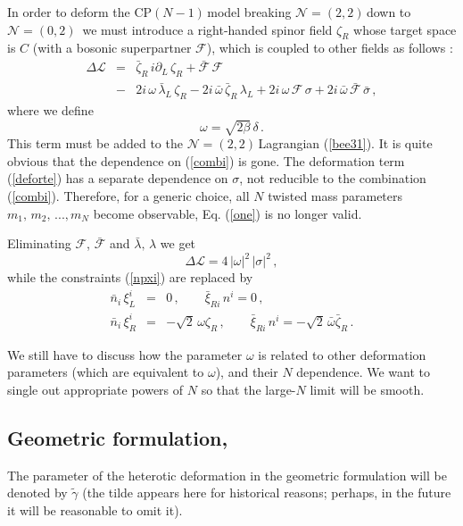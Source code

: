 \documentclass[epsfig,12pt]{article}
\def\beq{\begin{equation}}
\def\eeq{\end{equation}}
\def\beqn{\begin{eqnarray}}
\def\eeqn{\end{eqnarray}}
\newcommand{\ntt}{${\mathcal N}=(2,2)\,$}
\newcommand{\nzt}{${\mathcal N}=(0,2)\,$}
\newcommand{\cpn}{CP$(N-1)\,$}
\newcommand{\cell}{{\mathcal L}}
\newcommand{\pt}{\partial}
\newcommand{\cf}{${\mathcal F}$}
\newcommand{\cfe}{{\mathcal F}}
\def\beqn{\begin{eqnarray}}
\def\eeqn{\end{eqnarray}}
\def\beq{\begin{equation}}
\def\eeq{\end{equation}}
\begin{document}
In order to deform the \cpn model breaking \ntt down to \mbox{\nzt}
we must introduce a right-handed spinor field $\zeta_R$ whose  target space is $C$ 
(with a bosonic superpartner \cf), which is coupled to other fields as follows
\cite{EdTo,SY1}:
\beqn
\Delta\cell 
&=&
\bar\zeta_R\, i\pt_L\, \zeta_R   +\bar\cfe\,\cfe
	\nonumber\\[2mm]
&-&
 2i\, \omega \, \bar\lambda_L\, \zeta_R -  2i\, \bar{\omega} \, \bar\zeta_R\, \lambda_L +
	 2i\, \omega \, \cfe\, \sigma +
 2i\, \bar{\omega} \, \bar\cfe\, \bar{\sigma}\,,
 \label{deforte}
\eeqn
where we define
\beq
\omega = \sqrt{2\beta}\,\delta\,.
\eeq
This term must be added to the \ntt Lagrangian (\ref{bee31}). 
It is quite obvious that the dependence on (\ref{combi}) is gone. 
The deformation term (\ref{deforte}) has a separate dependence on $\sigma$, not reducible to the
combination (\ref{combi}). Therefore, for a generic choice, all $N$ twisted mass
parameters $m_1,\,m_2,\, ..., m_N$ become observable, Eq. (\ref{one}) is no longer valid.

\vspace{1mm}

Eliminating \cf, $\bar\cfe$  and $\bar\lambda ,\,\lambda$ we get
\beq
\Delta\cell = 4\, |\omega |^2\,|\sigma |^2\,,
\eeq
while the constraints (\ref{npxi}) are replaced by
\beqn
\bar{n}_i\,\xi^i_L
&= &
0\,,\qquad \bar\xi_{Ri}\,n^i = 0\,,
\nonumber\\[2mm]
\bar{n}_i\,\xi^i_R
&= &
 -\sqrt{2}\,\omega\zeta_R\,,\qquad \bar\xi_{Ri}\,n^i =  -\sqrt{2}\,\bar\omega\bar\zeta_R\,.
\label{npxip}
\eeqn

We still have to discuss how the parameter $\omega$ is related to other
deformation parameters (which are equivalent to $\omega$), and their $N$ dependence.
We want to single out appropriate powers of $N$ so that the large-$N$ limit will be smooth.

\subsection{Geometric formulation, } 
\label{gftgnz}

The parameter of the heterotic deformation in the geometric formulation will be denoted by
$\tilde \gamma$ (the tilde appears here for historical reasons;
perhaps, in the future it will be reasonable to omit it).
\end{document}

